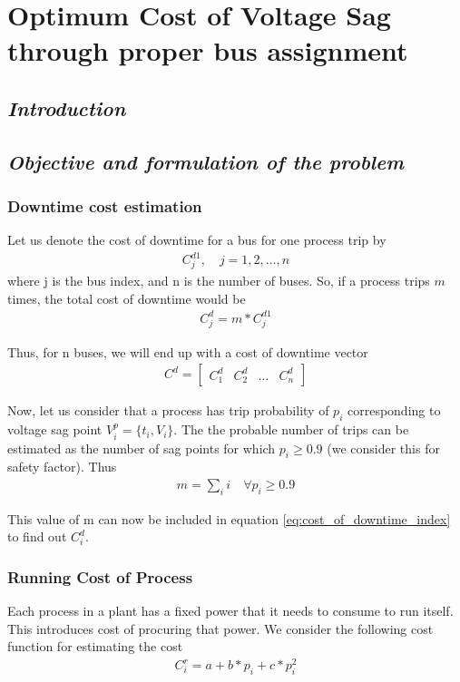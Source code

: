 \documentclass[12pt, twocolumn]{extreport}
\begin{document}
	\chapter{Optimum Cost of Voltage Sag through proper bus assignment}
	\section[Introduction]{\textit{Introduction}} 
	\section[Objective and formulation of the problem]{\textit{Objective and formulation of the problem}}
	
	\subsection[Downtime cost estimation]{Downtime cost estimation} Let us denote the cost of downtime for a bus for one process trip by \begin{align*}
	C^{d1}_{j} ,\quad j=1,2,\ldots, n 
	\end{align*}
	 where j is the bus index, and n is the number of buses.
	 So, if a process trips $ m $ times, the total cost of downtime would  be \begin{align}
	 C^{d}_{j} = m*C^{d1}_{j}
	 \label{eq:cost_of_downtime_index}
	 \end{align}
	 
	 Thus, for n buses, we will end up with a cost of downtime vector \begin{align}
	 C^{d} = \begin{bmatrix}
	 C^{d}_{1} & C^{d}_{2} & \ldots & C^{d}_{n}
	 \end{bmatrix}
	 \label{eq:cost_of_downtime_vec}
	 \end{align}
	 
	 Now, let us consider that a process has trip probability of $ p_{i} $ corresponding to voltage sag point $ V^{p}_{i} = \{t_{i}, V_{i}\} $. The the probable number of trips can be estimated as the number of sag points for which $ p_{i} \geq 0.9 $ (we consider this for safety factor). Thus \begin{align*}
	 m = \sum_{i}i \quad \forall p_{i} \geq 0.9
	 \end{align*}
	 
	 This value of m can now be included in equation \ref{eq:cost_of_downtime_index} to find out $ C^{d}_{i} $.
	 \subsection[Running Cost of Process]{Running Cost of Process} Each process in a plant has a fixed power that it needs to consume to run itself. This introduces cost of procuring that power. We consider the following cost function for estimating the cost
	 \begin{align}
	 C^{r}_{i} = a + b*p_{i}+c *p_{i}^{2} \label{eq:cost_of_running}
	 \end{align}
	 
\end{document}

